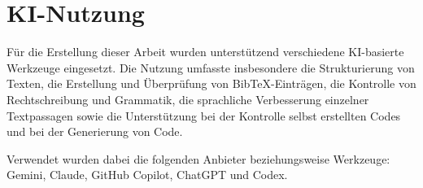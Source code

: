 \section{KI-Nutzung}

Für die Erstellung dieser Arbeit wurden unterstützend verschiedene KI-basierte Werkzeuge eingesetzt. Die Nutzung umfasste insbesondere die Strukturierung von Texten, die Erstellung und Überprüfung von BibTeX-Einträgen, die Kontrolle von Rechtschreibung und Grammatik, die sprachliche Verbesserung einzelner Textpassagen sowie die Unterstützung bei der Kontrolle selbst erstellten Codes und bei der Generierung von Code.

Verwendet wurden dabei die folgenden Anbieter beziehungsweise Werkzeuge: Gemini, Claude, GitHub Copilot, ChatGPT und Codex.
